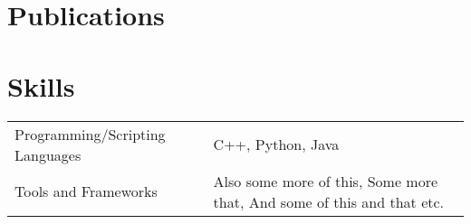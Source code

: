 \documentclass[a4paper,12pt]{article}
\begin{document}
\section{Publications}
\begin{refsection}
\nocite{*}
\printbibliography[heading=none]
\end{refsection}

\section{Skills}
\begin{tabularx}{\linewidth}{@{}l X@{}}
Programming/Scripting Languages &  \normalsize{C++, Python, Java}\\
Tools and Frameworks &  \normalsize{Also some more of this, Some more that, And some of this and that etc.}\\  
\end{tabularx}


\vfill
{}
\end{document}
